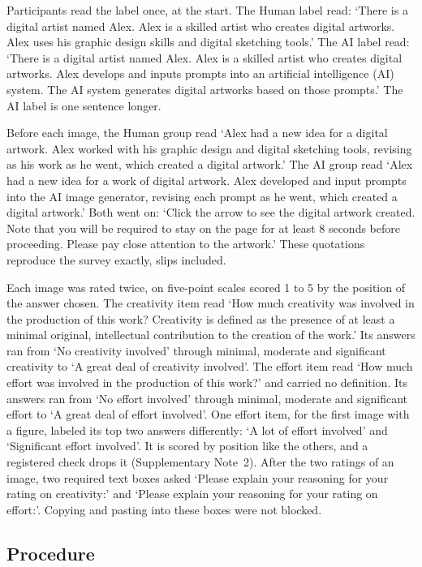 Participants read the label once, at the start. The Human label read: `There is a digital artist named Alex. Alex is a skilled artist who creates digital artworks. Alex uses his graphic design skills and digital sketching tools.' The AI label read: `There is a digital artist named Alex. Alex is a skilled artist who creates digital artworks. Alex develops and inputs prompts into an artificial intelligence (AI) system. The AI system generates digital artworks based on those prompts.' The AI label is one sentence longer.

Before each image, the Human group read `Alex had a new idea for a digital artwork. Alex worked with his graphic design and digital sketching tools, revising as his work as he went, which created a digital artwork.' The AI group read `Alex had a new idea for a work of digital artwork. Alex developed and input prompts into the AI image generator, revising each prompt as he went, which created a digital artwork.' Both went on: `Click the arrow to see the digital artwork created. Note that you will be required to stay on the page for at least 8 seconds before proceeding. Please pay close attention to the artwork.' These quotations reproduce the survey exactly, slips included.

Each image was rated twice, on five-point scales scored 1 to 5 by the position of the answer chosen. The creativity item read `How much creativity was involved in the production of this work? Creativity is defined as the presence of at least a minimal original, intellectual contribution to the creation of the work.' Its answers ran from `No creativity involved' through minimal, moderate and significant creativity to `A great deal of creativity involved'. The effort item read `How much effort was involved in the production of this work?' and carried no definition. Its answers ran from `No effort involved' through minimal, moderate and significant effort to `A great deal of effort involved'. One effort item, for the first image with a figure, labeled its top two answers differently: `A lot of effort involved' and `Significant effort involved'. It is scored by position like the others, and a registered check drops it (Supplementary Note~2). After the two ratings of an image, two required text boxes asked `Please explain your reasoning for your rating on creativity:' and `Please explain your reasoning for your rating on effort:'. Copying and pasting into these boxes were not blocked.

\subsection*{Procedure}

